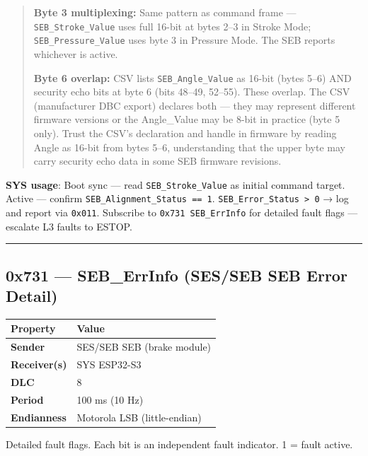 \begin{quote}
\textbf{Byte 3 multiplexing:} Same pattern as command frame ---
\texttt{SEB\_Stroke\_Value} uses full 16-bit at bytes 2--3 in Stroke Mode;
\texttt{SEB\_Pressure\_Value} uses byte 3 in Pressure Mode. The SEB reports
whichever is active.

\textbf{Byte 6 overlap:} CSV lists \texttt{SEB\_Angle\_Value} as 16-bit (bytes
5--6) AND security echo bits at byte 6 (bits 48--49, 52--55). These overlap. The
CSV (manufacturer DBC export) declares both --- they may represent different
firmware versions or the Angle\_Value may be 8-bit in practice (byte 5 only).
Trust the CSV's declaration and handle in firmware by reading Angle as 16-bit
from bytes 5--6, understanding that the upper byte may carry security echo data
in some SEB firmware revisions.
\end{quote}

\textbf{SYS usage}: Boot sync --- read \texttt{SEB\_Stroke\_Value} as initial
command target. Active --- confirm \texttt{SEB\_Alignment\_Status\ ==\ 1}.
\texttt{SEB\_Error\_Status\ \textgreater{}\ 0} → log and report via
\texttt{0x011}. Subscribe to \texttt{0x731\ SEB\_ErrInfo} for detailed fault
flags --- escalate L3 faults to ESTOP.

\begin{center}\rule{0.5\linewidth}{0.5pt}\end{center}

\subsection{0x731 --- SEB\_ErrInfo (SES/SEB SEB Error
Detail)}\label{x731-seb_errinfo-SES/SEB-seb-error-detail}

\begin{longtable}[]{@{}ll@{}}
\toprule\noalign{}
Property & Value \\
\midrule\noalign{}
\endhead
\bottomrule\noalign{}
\endlastfoot
\textbf{Sender} & SES/SEB SEB (brake module) \\
\textbf{Receiver(s)} & SYS ESP32-S3 \\
\textbf{DLC} & 8 \\
\textbf{Period} & 100 ms (10 Hz) \\
\textbf{Endianness} & Motorola LSB (little-endian) \\
\end{longtable}

Detailed fault flags. Each bit is an independent fault indicator. 1 = fault
active.

